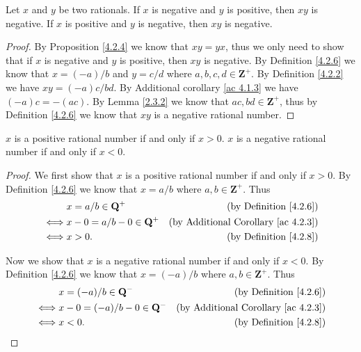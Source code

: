 \begin{additional corollary}\label{ac 4.2.6}
Let \(x\) and \(y\) be two rationals.
If \(x\) is negative and \(y\) is positive, then \(xy\) is negative.
If \(x\) is positive and \(y\) is negative, then \(xy\) is negative.
\end{additional corollary}

\begin{proof}
    By Proposition \ref{4.2.4} we know that \(xy = yx\), thus we only need to show that if \(x\) is negative and \(y\) is positive, then \(xy\) is negative.
    By Definition \ref{4.2.6} we know that \(x = (-a) / b\) and \(y = c / d\) where \(a, b, c, d \in \mathbf{Z}^+\).
    By Definition \ref{4.2.2} we have \(xy = (-a)c / bd\).
    By Additional corollary \ref{ac 4.1.3} we have \((-a)c = -(ac)\).
    By Lemma \ref{2.3.2} we know that \(ac, bd \in \mathbf{Z}^+\), thus by Definition \ref{4.2.6} we know that \(xy\) is a negative rational number.
\end{proof}

\begin{additional corollary}\label{ac 4.2.7}
\(x\) is a positive rational number if and only if \(x > 0\).
\(x\) is a negative rational number if and only if \(x < 0\).
\end{additional corollary}

\begin{proof}
    We first show that \(x\) is a positive rational number if and only if \(x > 0\).
    By Definition \ref{4.2.6} we know that \(x = a / b\) where \(a, b \in \mathbf{Z}^+\).
    Thus
    \begin{align*}
             & x = a / b \in \mathbf{Q}^+         & \text{(by Definition \ref{4.2.6})}              \\
        \iff & x - 0 = a / b - 0 \in \mathbf{Q}^+ & \text{(by Additional Corollary \ref{ac 4.2.3})} \\
        \iff & x > 0.                             & \text{(by Definition \ref{4.2.8})}
    \end{align*}

    Now we show that \(x\) is a negative rational number if and only if \(x < 0\).
    By Definition \ref{4.2.6} we know that \(x = (-a) / b\) where \(a, b \in \mathbf{Z}^+\).
    Thus
    \begin{align*}
             & x = (-a) / b \in \mathbf{Q}^-         & \text{(by Definition \ref{4.2.6})}              \\
        \iff & x - 0 = (-a) / b - 0 \in \mathbf{Q}^- & \text{(by Additional Corollary \ref{ac 4.2.3})} \\
        \iff & x < 0.                                & \text{(by Definition \ref{4.2.8})}
    \end{align*}
\end{proof}

